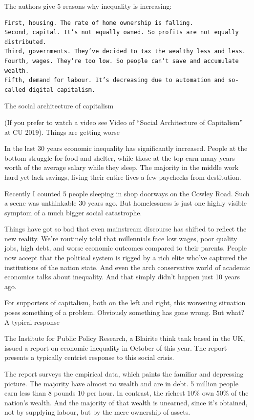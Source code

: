 \documentclass[
]{book}
\begin{document}
The authors give 5 reasons why inequality is increasing:

\begin{verbatim}
First, housing. The rate of home ownership is falling.
Second, capital. It’s not equally owned. So profits are not equally distributed.
Third, governments. They’ve decided to tax the wealthy less and less.
Fourth, wages. They’re too low. So people can’t save and accumulate wealth.
Fifth, demand for labour. It’s decreasing due to automation and so-called digital capitalism.
\end{verbatim}

The social architecture of capitalism

(If you prefer to watch a video see Video of ``Social Architecture of Capitalism'' at CU 2019).
Things are getting worse

In the last 30 years economic inequality has significantly increased. People at the bottom struggle for food and shelter, while those at the top earn many years worth of the average salary while they sleep. The majority in the middle work hard yet lack savings, living their entire lives a few paychecks from destitution.

Recently I counted 5 people sleeping in shop doorways on the Cowley Road. Such a scene was unthinkable 30 years ago. But homelessness is just one highly visible symptom of a much bigger social catastrophe.

Things have got so bad that even mainstream discourse has shifted to reflect the new reality. We're routinely told that millennials face low wages, poor quality jobs, high debt, and worse economic outcomes compared to their parents. People now accept that the political system is rigged by a rich elite who've captured the institutions of the nation state. And even the arch conservative world of academic economics talks about inequality. And that simply didn't happen just 10 years ago.

For supporters of capitalism, both on the left and right, this worsening situation poses something of a problem. Obviously something has gone wrong. But what?
A typical response

The Institute for Public Policy Research, a Blairite think tank based in the UK, issued a report on economic inequality in October of this year. The report presents a typically centrist response to this social crisis.

The report surveys the empirical data, which paints the familiar and depressing picture. The majority have almost no wealth and are in debt. 5 million people earn less than 8 pounds 10 per hour. In contrast, the richest 10\% own 50\% of the nation's wealth. And the majority of that wealth is unearned, since it's obtained, not by supplying labour, but by the mere ownership of assets.
\end{document}
